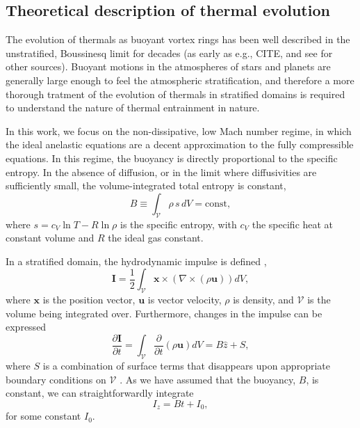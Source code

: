 \documentclass[twocolumn, amsmath, amsfonts, amssymb, trackchanges]{aastex62}
\newcommand{\grad}{\ensuremath{\nabla}}
\begin{document}
\subsection{Theoretical description of thermal evolution}
The evolution of thermals as buoyant vortex rings has been well described in
the unstratified, Boussinesq limit for decades (as early as e.g., CITE, and
see \citet{lecoanet&jeevanjee2018} for other sources). Buoyant motions 
in the atmospheres of stars and planets are generally large enough to feel the
atmospheric stratification, and therefore a more thorough tratment of the
evolution of thermals in stratified domains is required to understand the nature
of thermal entrainment in nature.

In this work, we focus on the non-dissipative, low Mach number regime, 
in which the ideal anelastic equations are a decent approximation to the fully
compressible equations. In this regime, the buoyancy is directly proportional to the
specific entropy. In the absence of diffusion, or in the limit where diffusivities
are sufficiently small, the volume-integrated total entropy is constant,
\begin{equation}
B \equiv \int_{\mathcal{V}} \rho\, s\, dV = \text{const},
\end{equation}
where $s = c_V \ln T - R \ln\rho$ is the specific entropy, with $c_V$ the
specific heat at constant volume and $R$ the ideal gas constant.

In a stratified domain, the hydrodynamic impulse is defined
\citet{shivamoggi2010},
\begin{equation}
\bm{I} = \frac{1}{2}\int_{\mathcal{V}} \bm{x}\times(\grad\times(\rho\bm{u}))dV,
\end{equation}
where $\bm{x}$ is the position vector, $\bm{u}$ is vector velocity, $\rho$ is density,
and $\mathcal{V}$ is the volume being integrated over. Furthermore, changes in the impulse
can be expressed
\begin{equation}
\frac{\partial\bm{I}}{\partial t} = \int_{\mathcal{V}}\frac{\partial}{\partial t}(\rho \bm{u})dV
= B\hat{z} + S,
\end{equation}
where $S$ is a combination of surface terms that disappears upon appropriate boundary conditions
on $\mathcal{V}$ \citep{shivamoggi2010}. As we have assumed that the buoyancy, $B$, is constant,
we can straightforwardly integrate
\begin{equation}
I_z = B t + I_0,
\end{equation}
for some constant $I_0$.
\end{document}
